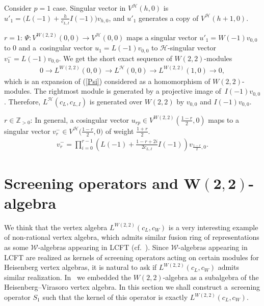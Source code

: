 \documentclass[11pt]{article}
\numberwithin{equation}{section}
\newcommand{\N}{{\mathbb Z}_{> 0} }
\newcommand{\HVir}{\mathcal H}
\begin{document}
\begin{Example} \label{verma_prim}
Consider $p=1$ case. Singular vector in $V^{\HVir}(h,0) $ is $u'_{1}=\big( L(-1) +\frac{h}{c_{L,I}}I(-1) \big) v_{h,0}$, and $u'_{1}$ generates a copy of $V^{\HVir}(h+1,0) $.

$r=1$: $\Psi \colon V^{W(2,2)}(0,0) \rightarrow V^{\HVir}(0,0) $ maps a singular vector $u'_1 = W(-1) v_{0,0}$ to $0$ and a~cosingular vector $u_1 = L(-1) v_{0,0}$ to $\HVir$-singular vector $v_1^- = L(-1) v_{0,0}$. We get the short exact sequence of $W(2,2)$-modules
\begin{gather*}
0\rightarrow L^{W(2,2)}(0,0) \rightarrow L^{\HVir}(0,0) \rightarrow L^{W(2,2)}(1,0) \rightarrow 0,
\end{gather*}
which is an expansion of (\ref{Psi}) considered as a homomorphism of $W(2,2)$-modules. The rightmost module is generated by a projective image of~$I(-1)v_{0,0}$. Therefore, $L^{\HVir}(c_L, c_{L,I})$ is generated over $W(2,2)$ by $v_{0,0}$ and $I(-1)v_{0,0}$.

$r\in \N$: In general, a cosingular vector $u_{rp}\in V^{W(2,2)}\left( \frac{1-r}{2},0\right) $ maps to a singular vector $v_r^- \in V^{
\HVir}\big( \frac{1-r}{2},0\big)$ of weight ${\frac{1+r}{2}}$.
\begin{gather*}
v_r^- = \prod\limits_{i=0}^{r-1}\left( L(-1) +\frac{1-r+2i}{2c_{L,I}}I(-1) \right) v_{\frac{1-r}{2},0}.
\end{gather*}
\end{Example}

\section[Screening operators and $W(2,2)$-algebra]{Screening operators and $\boldsymbol{W(2,2)}$-algebra}\label{screenings}

We think that the vertex algebra $L^{W(2,2)} (c_L, c_W) $ is a very interesting example of non-rational vertex algebra, which admits similar fusion ring of representations as some ${\mathcal W}$-algebras appearing in LCFT (cf.\ \cite{A1,AdM1,CM,FGST}). Since $\mathcal W$-algebras appearing in LCFT are realized as kernels of screening operators acting on certain modules for Heisenberg vertex algebras, it is natural to ask if $L^{W(2,2)} (c_L, c_W) $ admits similar realization. In~\cite{nas} we embedded the $W(2,2)$-algebra as a subalgebra of the Heisenberg--Virasoro vertex algebra. In this section we shall construct a~screening operator $S_1$ such that the kernel of this operator is exactly $L^{W(2,2)} (c_L, c_W) $.
\end{document}
